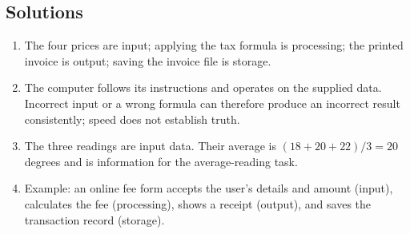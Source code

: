 \documentclass[11pt]{article}
\begin{document}
\subsection*{Solutions}
\begingroup\small
\begin{enumerate}[label=\arabic*.]
  \item The four prices are input; applying the tax formula is processing;
    the printed invoice is output; saving the invoice file is storage.
  \item The computer follows its instructions and operates on the supplied
    data. Incorrect input or a wrong formula can therefore produce an
    incorrect result consistently; speed does not establish truth.
  \item The three readings are input data. Their average is
    $(18+20+22)/3=20$ degrees and is information for the average-reading
    task.
  \item Example: an online fee form accepts the user's details and amount
    (input), calculates the fee (processing), shows a receipt (output), and
    saves the transaction record (storage).
\end{enumerate}
\endgroup
\end{document}
